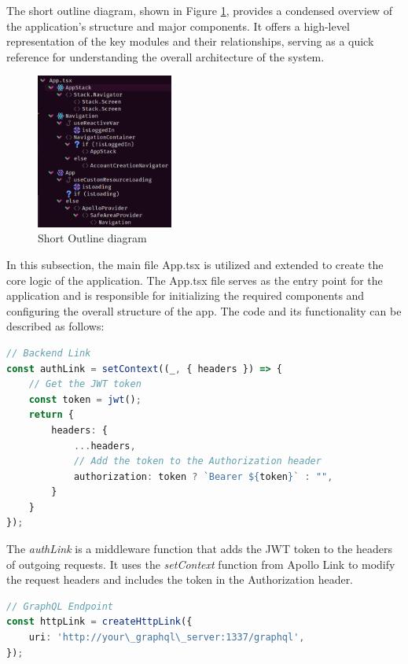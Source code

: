 The short outline diagram, shown in Figure \ref{fig:transaction_flow}, provides a condensed overview of the application's structure and major components. It offers a high-level representation of the key modules and their relationships, serving as a quick reference for understanding the overall architecture of the system.

\begin{figure}[h!]
  \centering
  \includegraphics[width=0.4\textwidth]{Diagram/Outline/OutlineMain.png}
  \caption{Short Outline diagram}
  \label{fig:transaction_flow}
\end{figure}


In this subsection, the main file {App.tsx} is utilized and extended to create the core logic of the application. The {App.tsx} file serves as the entry point for the application and is responsible for initializing the required components and configuring the overall structure of the app. The code and its functionality can be described as follows:



\begin{lstlisting}[language=TypeScript]
// Backend Link
const authLink = setContext((_, { headers }) => {
    // Get the JWT token
    const token = jwt();
    return {
        headers: {
            ...headers,
            // Add the token to the Authorization header
            authorization: token ? `Bearer ${token}` : "",
        }
    }
});
\end{lstlisting}

The \textit{authLink} is a middleware function that adds the JWT token to the headers of outgoing requests. It uses the \textit{setContext} function from Apollo Link to modify the request headers and includes the token in the Authorization header.


\begin{lstlisting}[language=TypeScript]
// GraphQL Endpoint
const httpLink = createHttpLink({
    uri: 'http://your\_graphql\_server:1337/graphql',
});
\end{lstlisting}

